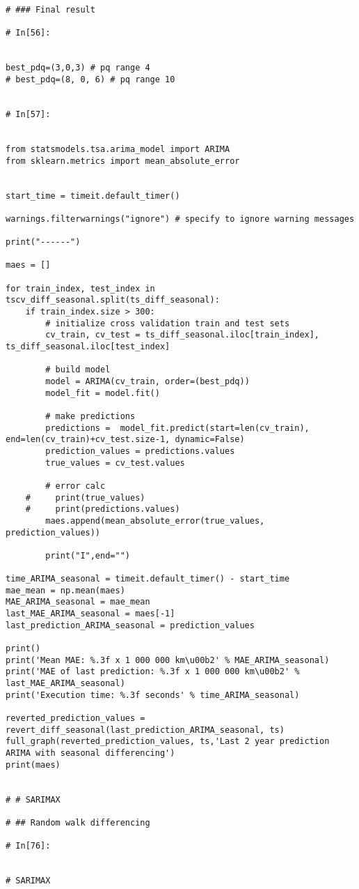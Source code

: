\begin{verbatim}
# ### Final result

# In[56]:


best_pdq=(3,0,3) # pq range 4
# best_pdq=(8, 0, 6) # pq range 10


# In[57]:


from statsmodels.tsa.arima_model import ARIMA
from sklearn.metrics import mean_absolute_error


start_time = timeit.default_timer()

warnings.filterwarnings("ignore") # specify to ignore warning messages

print("------")

maes = []

for train_index, test_index in tscv_diff_seasonal.split(ts_diff_seasonal):
    if train_index.size > 300:
        # initialize cross validation train and test sets
        cv_train, cv_test = ts_diff_seasonal.iloc[train_index], ts_diff_seasonal.iloc[test_index]

        # build model
        model = ARIMA(cv_train, order=(best_pdq))
        model_fit = model.fit()

        # make predictions
        predictions =  model_fit.predict(start=len(cv_train), end=len(cv_train)+cv_test.size-1, dynamic=False)
        prediction_values = predictions.values
        true_values = cv_test.values

        # error calc
    #     print(true_values)
    #     print(predictions.values)
        maes.append(mean_absolute_error(true_values, prediction_values))

        print("I",end="")

time_ARIMA_seasonal = timeit.default_timer() - start_time
mae_mean = np.mean(maes)
MAE_ARIMA_seasonal = mae_mean
last_MAE_ARIMA_seasonal = maes[-1]
last_prediction_ARIMA_seasonal = prediction_values

print()
print('Mean MAE: %.3f x 1 000 000 km\u00b2' % MAE_ARIMA_seasonal)
print('MAE of last prediction: %.3f x 1 000 000 km\u00b2' % last_MAE_ARIMA_seasonal)
print('Execution time: %.3f seconds' % time_ARIMA_seasonal)

reverted_prediction_values = revert_diff_seasonal(last_prediction_ARIMA_seasonal, ts)
full_graph(reverted_prediction_values, ts,'Last 2 year prediction ARIMA with seasonal differencing')
print(maes)


# # SARIMAX

# ## Random walk differencing

# In[76]:


# SARIMAX


\end{verbatim}
